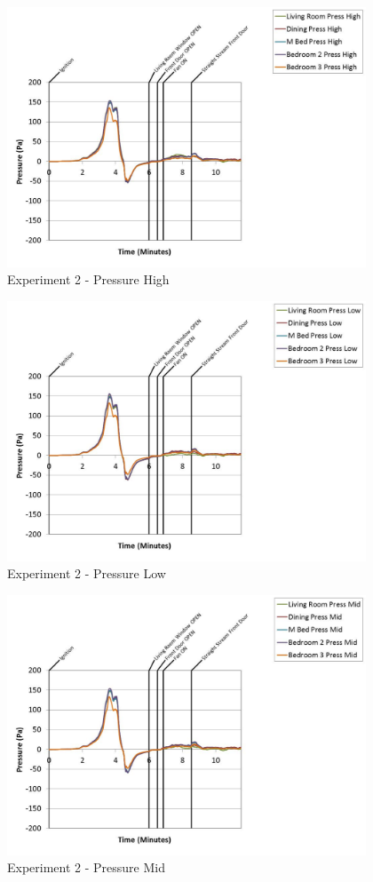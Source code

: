 \documentclass{article}
\begin{document}
\begin{appendices}
	\begin{figure}[h!]
		\centering
		\includegraphics[height=3.05in]{0_Images/Results_Charts/Exp_2_Charts/PressureHigh.pdf}
		\caption{Experiment 2 - Pressure High}
	\end{figure}
 
	\clearpage

	\begin{figure}[h!]
		\centering
		\includegraphics[height=3.05in]{0_Images/Results_Charts/Exp_2_Charts/PressureLow.pdf}
		\caption{Experiment 2 - Pressure Low}
	\end{figure}
 

	\begin{figure}[h!]
		\centering
		\includegraphics[height=3.05in]{0_Images/Results_Charts/Exp_2_Charts/PressureMid.pdf}
		\caption{Experiment 2 - Pressure Mid}
	\end{figure}
 

\end{appendices}
\end{document}
